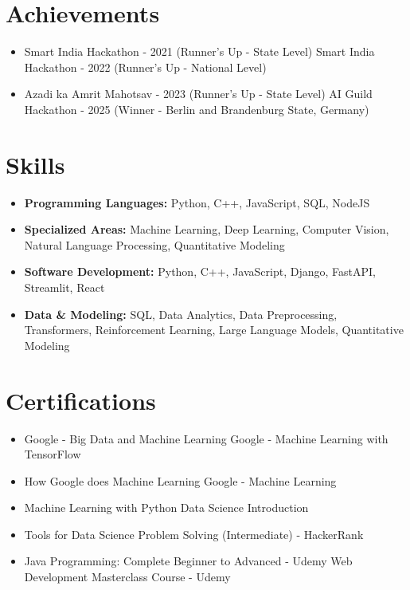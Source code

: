 \documentclass[a4paper,10pt]{article}
\begin{document}
\section*{Achievements}
\begin{itemize}
\item Smart India Hackathon - 2021 (Runner's Up - State Level) \hfill Smart India Hackathon - 2022 (Runner's Up - National Level)
\item Azadi ka Amrit Mahotsav - 2023 (Runner's Up - State Level) \hfill AI Guild Hackathon - 2025 (Winner - Berlin and Brandenburg State, Germany)
\end{itemize}

\section*{Skills}
\begin{itemize}
  \item \textbf{Programming Languages:} Python, C++, JavaScript, SQL, NodeJS
  \item \textbf{Specialized Areas:} Machine Learning, Deep Learning, Computer Vision, Natural Language Processing, Quantitative Modeling
  \item \textbf{Software Development:} Python, C++, JavaScript, Django, FastAPI, Streamlit, React
  \item \textbf{Data \& Modeling:} SQL, Data Analytics, Data Preprocessing, Transformers, Reinforcement Learning, Large Language Models, Quantitative Modeling
\end{itemize}

\section*{Certifications}
\begin{itemize}
\item Google - Big Data and Machine Learning \hfill Google - Machine Learning with TensorFlow
\item How Google does Machine Learning \hfill Google - Machine Learning
\item Machine Learning with Python \hfill Data Science Introduction
\item Tools for Data Science \hfill Problem Solving (Intermediate) - HackerRank
\item Java Programming: Complete Beginner to Advanced - Udemy \hfill Web Development Masterclass Course - Udemy
\end{itemize}
\end{document}
